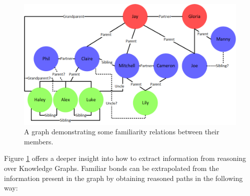 
\begin{figure}[!h]
    \centering
    \includegraphics[width=\textwidth]{fig/kgs/Family_graph.png}
    \caption{A graph demonstrating some familiarity relations between their members.}
    \label{fig:kgs-family} %
\end{figure}

Figure \ref{fig:kgs-family} offers a deeper insight into how to extract information from reasoning over Knowledge Graphs. Familiar bonds can be extrapolated from the information present in the graph by obtaining reasoned paths in the following way:

